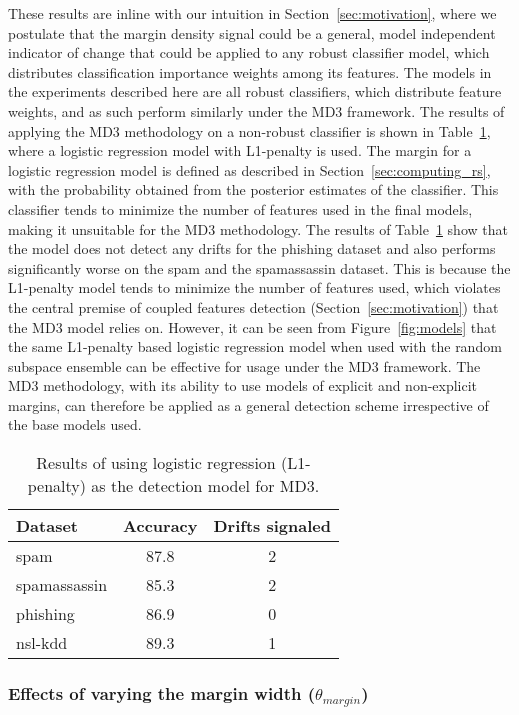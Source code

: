 \documentclass[authoryear,3p,times,twocolumn]{elsarticle}
\begin{document}
These results are inline with our intuition in Section~\ref{sec:motivation}, where we postulate that the margin density signal could be a general,  model independent indicator of change that could be applied to any robust classifier model, which distributes classification importance weights among its features. The models in the experiments described here are all robust classifiers, which distribute feature weights, and as such perform similarly under the MD3 framework. The results of applying the MD3 methodology on a non-robust classifier is shown in Table~\ref{tbl:l1}, where a logistic regression model with L1-penalty is used. The margin for a logistic regression model is defined as described in Section~\ref{sec:computing_rs}, with the probability obtained from the posterior estimates of the classifier. This classifier tends to minimize the number of features used in the final models, making it unsuitable for the MD3 methodology. The results of Table~\ref{tbl:l1} show that the model does not detect any drifts for the phishing dataset and also performs significantly worse on the spam and the spamassassin dataset. This is because the L1-penalty model tends to minimize the number of features used, which violates the central premise of coupled features detection (Section~\ref{sec:motivation}) that the MD3 model relies on. However, it can be seen from Figure~\ref{fig:models} that the same L1-penalty based logistic regression model when used with the random subspace ensemble can be effective for usage under the MD3 framework. The MD3 methodology, with its ability to use models of explicit and non-explicit margins, can therefore be applied as a general detection scheme irrespective of the base models used. 

\begin{table}[]
\centering
\caption{Results of using logistic regression (L1-penalty) as the detection model for MD3.}
\label{tbl:l1}
\begin{tabular}{|l|c|c|}
\hline
Dataset & \multicolumn{1}{l|}{Accuracy} & \multicolumn{1}{l|}{Drifts signaled} \\ \hline
spam & 87.8 & 2 \\ \hline
spamassassin & 85.3 & 2 \\ \hline
phishing & 86.9 & 0 \\ \hline
nsl-kdd & 89.3 & 1 \\ \hline
\end{tabular}
\end{table}

\subsubsection{Effects of varying the margin width ($\theta_{margin}$)}
\label{sec:marginwidths}
\end{document}
